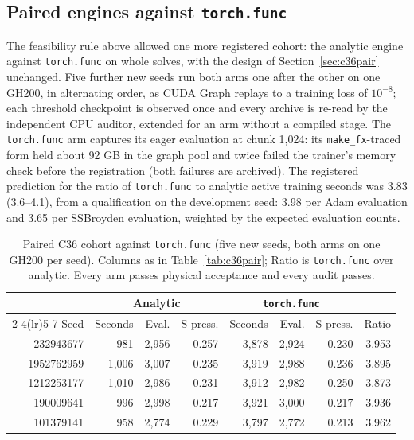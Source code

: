 \documentclass[11pt]{article}
\begin{document}
\subsection{Paired engines against \texttt{torch.func}}\label{sec:c36pairfunc}
The feasibility rule above allowed one more registered cohort: the
analytic engine against \texttt{torch.func} on whole solves, with the
design of Section~\ref{sec:c36pair} unchanged. Five further new seeds run
both arms one after the other on one GH200, in alternating order, as CUDA
Graph replays to a training loss of $10^{-8}$; each threshold checkpoint is
observed once and every archive is re-read by the independent CPU auditor,
extended for an arm without a compiled stage. The \texttt{torch.func} arm
captures its eager evaluation at chunk 1,024: its \texttt{make\_fx}-traced
form held about 92 GB in the graph pool and twice failed the trainer's
memory check before the registration (both failures are archived). The
registered prediction for the ratio of \texttt{torch.func} to analytic active
training seconds was 3.83 (3.6--4.1), from a qualification on the
development seed: 3.98 per Adam evaluation and 3.65 per SSBroyden
evaluation, weighted by the expected evaluation counts.

\begin{table}[htbp]\centering\small
\setlength{\tabcolsep}{4pt}
\caption{Paired C36 cohort against \texttt{torch.func} (five new seeds, both
arms on one GH200 per seed). Columns as in Table~\ref{tab:c36pair}; Ratio is
\texttt{torch.func} over analytic. Every arm passes physical acceptance and
every audit passes.}
\label{tab:c36pairfunc}
\begin{tabular}{rrrrrrrr}\toprule
 & \multicolumn{3}{c}{Analytic} & \multicolumn{3}{c}{\texttt{torch.func}} & \\\cmidrule(lr){2-4}\cmidrule(lr){5-7}
Seed & Seconds & Eval. & S press. & Seconds & Eval. & S press. & Ratio\\\midrule
232943677 & 981 & 2,956 & 0.257 & 3,878 & 2,924 & 0.230 & 3.953\\
1952762959 & 1,006 & 3,007 & 0.235 & 3,919 & 2,988 & 0.236 & 3.895\\
1212253177 & 1,010 & 2,986 & 0.231 & 3,912 & 2,982 & 0.250 & 3.873\\
190009641 & 996 & 2,998 & 0.217 & 3,921 & 3,000 & 0.217 & 3.936\\
101379141 & 958 & 2,774 & 0.229 & 3,797 & 2,772 & 0.213 & 3.962
\\\bottomrule\end{tabular}
\end{table}
\end{document}
